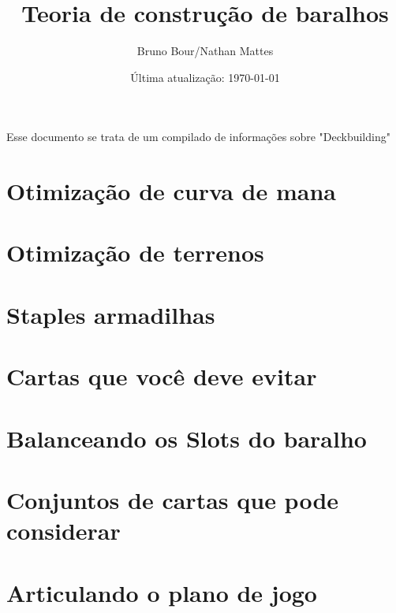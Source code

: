 \documentclass[12pt, a4paper]{article}
\begin{document}
\bgroup\obeylines

\title{Teoria de construção de baralhos}
\author{Bruno Bour/Nathan Mattes}
\date{Última atualização: \today}
    \maketitle

    \tableofcontents
 
    Esse documento se trata de um compilado de informações sobre "Deckbuilding"
    


    \section{Otimização de curva de mana}
     \pagebreak
    
    \section{Otimização de terrenos}
     \pagebreak

    \section{Staples armadilhas}
     \pagebreak

    \section{Cartas que você deve evitar}
     \pagebreak

    \section{Balanceando os Slots do baralho}
     \pagebreak

    \section{Conjuntos de cartas que pode considerar}
     \pagebreak

    \section{Articulando o plano de jogo}
     \pagebreak
\end{document}
